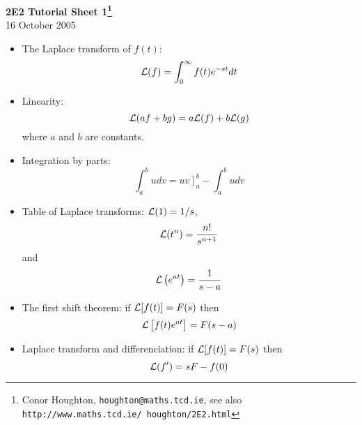 \documentclass[12pt]{article}
\begin{document}
\begin{center}
{\bf 2E2 Tutorial Sheet 1\footnote{Conor Houghton, {\tt houghton@maths.tcd.ie}, see also {\tt http://www.maths.tcd.ie/ houghton/2E2.html}}}\\[1cm]{} 16 October 2005
\end{center}

\begin{itemize}
\item The Laplace transform of $f(t)$:
\begin{equation}
{\cal L}(f)=\int_0^{\infty}{f(t)e^{-st}dt}
\end{equation}

\item Linearity:
\begin{equation}
{\cal L}(af+bg)=a{\cal L}(f)+b{\cal L}(g)
\end{equation}
where $a$ and $b$ are constants.

\item Integration by parts:
\begin{equation}
\int_a^b udv=\left. uv\right]_a^b- \int_a^b udv
\end{equation}


\item Table of Laplace transforms: ${\cal L}(1)=1/s$, 
\begin{equation}
{\cal L}(t^n)=\frac{n!}{s^{n+1}}
\end{equation}
and
\begin{equation}
{\cal L}\left(e^{at}\right)=\frac{1}{s-a}
\end{equation}


\item The first shift theorem: if ${\cal L}[f(t)]=F(s)$ then
\begin{equation}
{\cal L}\left[f(t)e^{at}\right]=F(s-a)
\end{equation}
\vskip 1cm
\item Laplace transform and differenciation: if ${\cal L}[f(t)]=F(s)$ then
\begin{equation}
{\cal L}(f')=sF-f(0)
\end{equation}

\end{itemize}

\newpage
\end{document}
